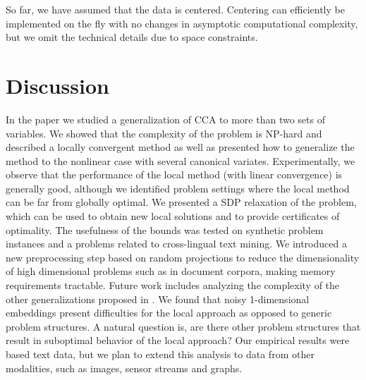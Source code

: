 So far, we have assumed that the data is centered. Centering can efficiently be implemented on the
fly with no changes in asymptotic computational complexity, but we omit the technical details due to space constraints.

\section{Discussion}\label{sec:discussion}

In the paper we studied a generalization of CCA to more than two
sets of variables. We showed that the complexity of the problem
is NP-hard and described a locally convergent method as well as
presented how to generalize the method to the nonlinear case with
several canonical variates.  Experimentally, we observe that the
performance of the local method (with linear convergence) is
generally good, although we identified problem settings where the
local method can be far from globally optimal. We presented a
SDP relaxation of the problem, which can be used to obtain new
local solutions and to provide certificates of optimality. The
usefulness of the bounds was tested on synthetic problem
instances and a problems related to cross-lingual text
mining. We introduced a new preprocessing step based on random
projections to reduce the dimensionality of high dimensional problems
such as in document corpora, making memory requirements tractable.
Future work includes analyzing the complexity of the other
generalizations proposed in \cite{Kettenring}. We found that
noisy 1-dimensional embeddings present difficulties for the local
approach as opposed to generic problem structures. A natural
question is, are there other problem structures that result in
suboptimal behavior of the local approach? Our empirical results were
based text data, but we plan to extend this analysis to data from other modalities, such as images, sensor streams and graphs.